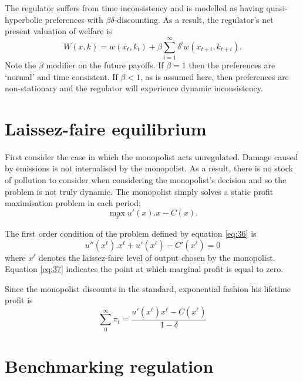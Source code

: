 The regulator suffers from time inconsistency and is modelled as
having quasi-hyperbolic preferences with $\beta\delta$-discounting. As
a result, the regulator's net present valuation of welfare is
\begin{equation}
  \label{eq:35}
  W(x,k) = w(x_t,k_t) + \beta \sum_{i=1}^\infty \delta^i w(x_{t+i},k_{t+i}).
\end{equation}
Note the $\beta$ modifier on the future payoffs. If $\beta=1$ then the
preferences are `normal' and time consistent. If $\beta<1$, as is
assumed here, then preferences are non-stationary and the regulator
will experience dynamic inconsistency.

\section{Laissez-faire equilibrium}
\label{sec:laiss-faire-equil}

First consider the case in which the monopolist acts
unregulated. Damage caused by emissions is not internalised by the
monopolist. As a result, there is no stock of pollution to consider
when considering the monopolist's decision and so the problem is not
truly dynamic. The monopolist simply solves a static profit
maximisation problem in each period:
\begin{equation}
  \label{eq:36}
  \max_x u'(x).x - C(x).
\end{equation}

The first order condition of the problem defined by equation
\eqref{eq:36} is
\begin{equation}
  \label{eq:37}
  u''\left( x^{\ell}\right) .x^{\ell} + u'\left( x^{\ell}\right)  - C'\left( x^{\ell}\right)  = 0
\end{equation}
where $x^{\ell}$ denotes the laissez-faire level of output chosen by
the monopolist. Equation \eqref{eq:37} indicates the point at which
marginal profit is equal to zero.

Since the monopolist discounts in the standard, exponential fashion
his lifetime profit is
\begin{equation}
  \label{eq:82}
  \sum_0^\infty \pi_t = \frac{u'\left(x^{\ell}\right) x^{\ell} -
    C\left( x^{\ell}\right)}{1-\delta}
\end{equation}


\section{Benchmarking regulation}
\label{sec:benchm-regul}

